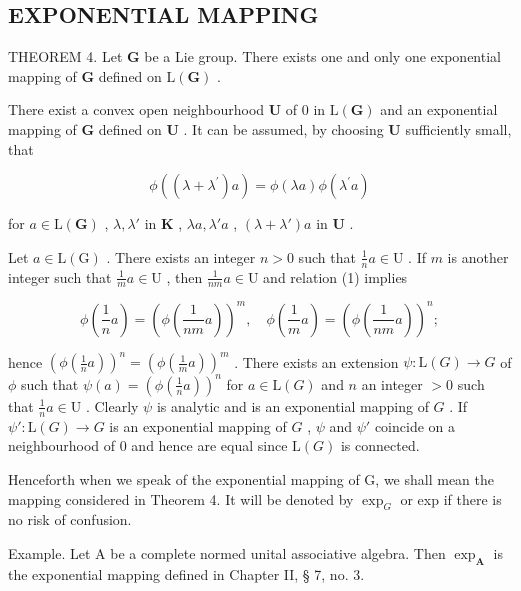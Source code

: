 \subsection{EXPONENTIAL MAPPING}

THEOREM 4. Let \(\mathbf{G}\) be a Lie group. There exists one and only one exponential mapping of \(\mathbf{G}\) defined on \(\mathrm{L}(\mathbf{G})\) .

There exist a convex open neighbourhood \(\mathbf{U}\) of 0 in \(\mathrm{L}(\mathbf{G})\) and an exponential mapping of \(\mathbf{G}\) defined on \(\mathbf{U}\) . It can be assumed, by choosing \(\mathbf{U}\) sufficiently small, that

\[
\phi ((\lambda + \lambda^ {\prime}) a) = \phi (\lambda a) \phi (\lambda^ {\prime} a)\tag{1}
\]

for \(a \in \mathrm{L}(\mathbf{G})\) , \(\lambda, \lambda'\) in \(\mathbf{K}\) , \(\lambda a, \lambda'a\) , \((\lambda + \lambda')a\) in \(\mathbf{U}\) .

Let \(a \in \mathrm{L}(\mathrm{G})\) . There exists an integer \(n > 0\) such that \(\frac{1}{n} a \in \mathrm{U}\) . If \(m\) is another integer such that \(\frac{1}{m} a \in \mathrm{U}\) , then \(\frac{1}{nm} a \in \mathrm{U}\) and relation (1) implies

\[
\phi \left(\frac {1}{n} a\right) = \left(\phi \left(\frac {1}{n m} a\right)\right) ^ {m}, \quad \phi \left(\frac {1}{m} a\right) = \left(\phi \left(\frac {1}{n m} a\right)\right) ^ {n};
\]

hence \(\left(\phi\left(\frac{1}{n}a\right)\right)^n = \left(\phi\left(\frac{1}{m}a\right)\right)^m\) . There exists an extension \(\psi: \mathrm{L}(G) \to G\) of \(\phi\) such that \(\psi(a) = \left(\phi\left(\frac{1}{n}a\right)\right)^n\) for \(a \in \mathrm{L}(G)\) and \(n\) an integer \(>0\) such that \(\frac{1}{n}a \in \mathrm{U}\) . Clearly \(\psi\) is analytic and is an exponential mapping of \(G\) . If \(\psi': \mathrm{L}(G) \to G\) is an exponential mapping of \(G\) , \(\psi\) and \(\psi'\) coincide on a neighbourhood of 0 and hence are equal since \(\mathrm{L}(G)\) is connected.

Henceforth when we speak of the exponential mapping of G, we shall mean the mapping considered in Theorem 4. It will be denoted by \(\exp_{G}\) or exp if there is no risk of confusion.

Example. Let A be a complete normed unital associative algebra. Then \(\exp_{\mathbf{A}}\) is the exponential mapping defined in Chapter II, § 7, no. 3.

